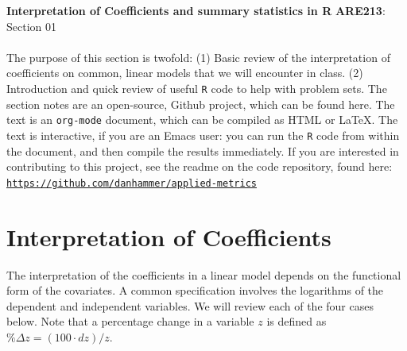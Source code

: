 \documentclass{article}
\title{}
\author{}
\date{\today}
\begin{document}
\setlength{\parindent}{0in}

\textbf{Interpretation of Coefficients and summary statistics in R} \hfill
\textbf{ARE213}: Section 01 \\ \\

The purpose of this section is twofold: (1) Basic review of the
interpretation of coefficients on common, linear models that we will
encounter in class. (2) Introduction and quick review of useful \texttt{R}
code to help with problem sets.  The section notes are an open-source,
Github project, which can be found here.  The text is an \texttt{org-mode}
document, which can be compiled as HTML or \LaTeX.  The text is
interactive, if you are an Emacs user: you can run the \texttt{R} code from
within the document, and then compile the results immediately.  If you
are interested in contributing to this project, see the readme on the
code repository, found here: \\

\href{https://github.com/danhammer/applied-metrics}{\texttt{https://github.com/danhammer/applied-metrics}}

\section*{Interpretation of Coefficients}
\label{sec-1}


The interpretation of the coefficients in a linear model depends on
the functional form of the covariates.  A common specification
involves the logarithms of the dependent and independent variables.
We will review each of the four cases below.  Note that a percentage
change in a variable $z$ is defined as $\% \Delta z =(100\cdot d
z)/{z}$.
\end{document}

